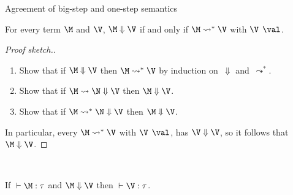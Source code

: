 \begin{frame}{Agreement of big-step and one-step semantics}
  \begin{theorem}
    For every term $\M$ and $\V$, $\M \Downarrow \V$ if and only if $ \M \leadsto^* \V$
    with $\V \;\, \val$. 
  \end{theorem}

  \begin{proof}[Proof sketch.]
    \begin{enumerate}
      \item Show that if $\M\Downarrow \V$ then $\M \leadsto^* \V$
        by induction on~$\Downarrow$ and~$\leadsto^*$. 
      \item Show that if $\M \leadsto \N \Downarrow \V$ then
          $\M\Downarrow \V$.
      \item Show that if $\M \leadsto^*   \N \Downarrow \V$ then $\M\Downarrow
        \V$.
    \end{enumerate}
    In particular, every $\M \leadsto^* \V$ with $\V\;\,\val$,
    has $\V\Downarrow \V$, so it follows that $\M\Downarrow \V$.
  \end{proof}
  ~\\

  \begin{corollary}
    If ${}\vdash \M : \tau$ and $\M \Downarrow \V$ then ${}\vdash \V : \tau$.
  \end{corollary}
\end{frame}


